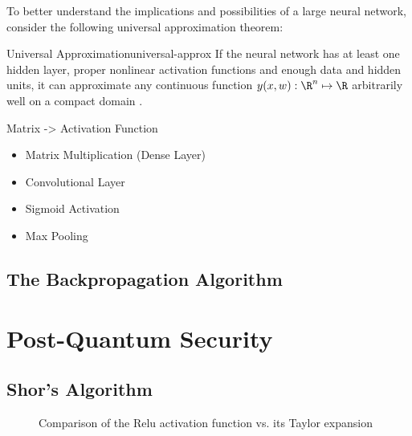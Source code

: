 To better understand the implications and possibilities of a large neural network, consider the following universal approximation theorem:

\begin{theorem}{Universal Approximation}{universal-approx}
  If the neural network has at least one hidden layer, proper nonlinear activation functions and enough data and hidden units, it can approximate any continuous function $y(x, w): \R^n \mapsto \R$ arbitrarily well on a compact domain \parencite{1989-HornikMultilayerFN}.
\end{theorem}

Matrix -> Activation Function
\begin{itemize}
  \item Matrix Multiplication (Dense Layer)
  \item Convolutional Layer
  \item Sigmoid Activation
  \item Max Pooling
\end{itemize}

\subsection{The Backpropagation Algorithm}

\section{Post-Quantum Security}
\label{sec:post-quantum-sec}
\subsection{Shor's Algorithm}

\begin{figure}[H]
  \centering
  
  \caption{Comparison of the Relu activation function vs. its Taylor expansion}
\end{figure}
